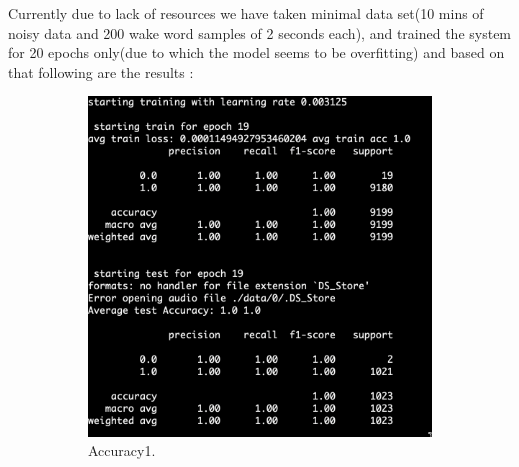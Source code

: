 \documentclass[fleqn,10pt]{SelfArx} %
\begin{document}
 

Currently due to lack of resources we have taken minimal data set(10 mins of noisy data and 200 wake word samples of 2 seconds each), and trained the system for 20 epochs only(due to which the model seems to be overfitting) and based on that following are the results :

\begin{figure}[h!]
  \centering
  \begin{subfigure}[b]{0.9\linewidth}
    \includegraphics[width=\linewidth]{1.png}
    \caption{Accuracy1.}
  \end{subfigure}
  \begin{subfigure}[b]{0.9\linewidth}

\end{subfigure}
\end{figure}
\end{document}
